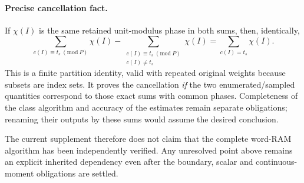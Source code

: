 \paragraph{Precise cancellation fact.}
If $\chi(I)$ is the same retained unit-modulus phase in both sums,
then, identically,
\[
 \sum_{c(I)\equiv t_s\ (\mathrm{mod}\ P)}\chi(I)
 -\sum_{\substack{c(I)\equiv t_s\ (\mathrm{mod}\ P)\\c(I)\ne t_s}}\chi(I)
 =\sum_{c(I)=t_s}\chi(I).
\]
This is a finite partition identity, valid with repeated original
weights because subsets are index sets. It proves the cancellation
\emph{if} the two enumerated/sampled quantities correspond to those
exact sums with common phases. Completeness of the class algorithm and
accuracy of the estimates remain separate obligations; renaming their
outputs by these sums would assume the desired conclusion.

The current supplement therefore does not claim that the complete
word-RAM algorithm has been independently verified. Any unresolved
point above remains an explicit inherited dependency even after the
boundary, scalar and continuous-moment obligations are settled.

